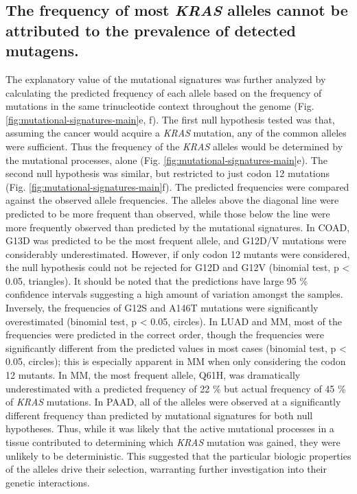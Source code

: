 \documentclass[english, 10pt, letterpaper]{article}
\newcommand{\KRAS}{\emph{KRAS}}
\begin{document}
\subsection*{The frequency of most \KRAS{} alleles cannot be attributed to the prevalence of detected mutagens.}

The explanatory value of the mutational signatures was further analyzed by calculating the predicted frequency of each allele based on the frequency of mutations in the same trinucleotide context throughout the genome (Fig. \ref{fig:mutational-signatures-main}e, f).
The first null hypothesis tested was that, assuming the cancer would acquire a \KRAS{} mutation, any of the common alleles were sufficient. Thus the frequency of the \KRAS{} alleles would be determined by the mutational processes, alone (Fig. \ref{fig:mutational-signatures-main}e).
The second null hypothesis was similar, but restricted to just codon 12 mutations (Fig. \ref{fig:mutational-signatures-main}f).
The predicted frequencies were compared against the observed allele frequencies.
The alleles above the diagonal line were predicted to be more frequent than observed, while those below the line were more frequently observed than predicted by the mutational signatures.
In COAD, G13D was predicted to be the most frequent allele, and G12D/V mutations were considerably underestimated.
However, if only codon 12 mutants were considered, the null hypothesis could not be rejected for G12D and G12V  (binomial test, p < 0.05, triangles).
It should be noted that the predictions have large 95 \% confidence intervals suggesting a high amount of variation amongst the samples.
Inversely, the frequencies of G12S and A146T mutations were significantly overestimated (binomial test, p < 0.05, circles).
In LUAD and MM, most of the frequencies were predicted in the correct order, though the frequencies were significantly different from the predicted values in most cases (binomial test, p < 0.05, circles); this is especially apparent in MM when only considering the codon 12 mutants.
In MM, the most frequent allele, Q61H, was dramatically underestimated with a predicted frequency of 22 \% but actual frequency of 45 \% of \KRAS{} mutations.
In PAAD, all of the alleles were observed at a significantly different frequency than predicted by mutational signatures for both null hypotheses.
Thus, while it was likely that the active mutational processes in a tissue contributed to determining which \KRAS{} mutation was gained, they were unlikely to be deterministic.
This suggested that the particular biologic properties of the alleles drive their selection, warranting further investigation into their genetic interactions.
\end{document}
